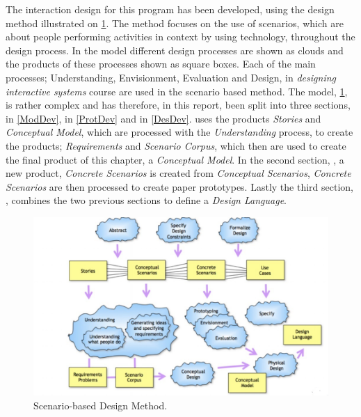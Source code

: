 The interaction design for this program has been developed, using the design method illustrated on \cref{scenarioModel}.
The method focuses on the use of scenarios, which are about people performing activities in context by using technology, throughout the design process.
In the model different design processes are shown as clouds and the products of these processes shown as square boxes.
Each of the main processes; Understanding, Envisionment, Evaluation and Design, in \textit{designing interactive systems} course are used in the scenario based method.
The model, \cref{scenarioModel}, is rather complex and has therefore, in this report, been split into three sections,  in \cref{ModDev},  in \cref{ProtDev} and  in \cref{DesDev}.
 uses the products \textit{Stories} and \textit{Conceptual Model}, which are processed with the \textit{Understanding} process, to create the products; \textit{Requirements} and \textit{Scenario Corpus}, which then are used to create the final product of this chapter, a \textit{Conceptual Model}.
In the second section, , a new product, \textit{Concrete Scenarios} is created from \textit{Conceptual Scenarios}, \textit{Concrete Scenarios} are then processed to create paper prototypes.
Lastly the third section, , combines the two previous sections to define a \textit{Design Language}.

\begin{figure}[H]
	\centering
	\includegraphics[width=1\textwidth]{Grafik/scenarioModel}
	\caption{Scenario-based Design Method.}
	\label{scenarioModel}
\end{figure}